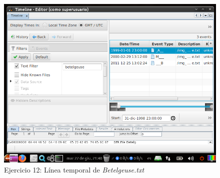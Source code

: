 \documentclass[11pt]{article}
\begin{document}
\begin{figure}[H]
    \caption{Ejercicio 12: Línea temporal de \textit{Betelgeuse.txt}}
    \centering
    \includegraphics[scale=0.7]{e12-10.png}
\end{figure}



\begin{thebibliography}{8}
\end{thebibliography}
\end{document}
